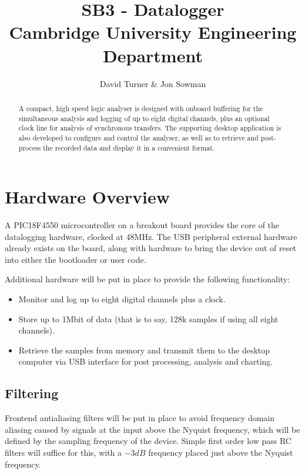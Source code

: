 \documentclass[11pt]{article}
\title{SB3 - Datalogger\\Cambridge University Engineering Department}
\author{David Turner \& Jon Sowman}
\begin{document}
    \maketitle
    \tableofcontents
	
\begin{abstract}
    A compact, high speed logic analyser is designed with onboard buffering for
    the simultaneous analysis and logging of up to eight digital channels, plus
    an optional clock line for analysis of synchronous transfers. The supporting
    desktop application is also developed to configure and control the analyser,
    as well as to retrieve and post-process the recorded data and display it in
    a convenient format.
\end{abstract}

\section{Hardware Overview}
    A PIC18F4550 microcontroller on a breakout board provides the core of the
    datalogging hardware, clocked at 48MHz. The USB peripheral external hardware
    already exists on the board, along with hardware to bring the device out of
    reset into either the bootloader or user code.

    Additional hardware will be put in place to provide the following
    functionality:
    \begin{itemize}
    \item Monitor and log up to eight digital channels plus a clock.
    \item Store up to 1Mbit of data (that is to say, 128k samples if using all
    eight channels).
    \item Retrieve the samples from memory and transmit them to the desktop
    computer via USB interface for post processing, analysis and charting.
    \end{itemize}

\subsection{Filtering}
    Frontend antialiasing filters will be put in place to avoid frequency domain
    aliasing caused by signals at the input above the Nyquist frequency, which
    will be defined by the sampling frequency of the device. Simple first order
    low pass RC filters will suffice for this, with a $-3dB$ frequency placed
    just above the Nyquist frequency.
\end{document}
